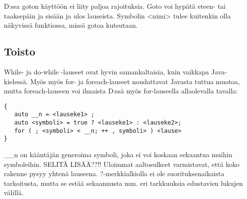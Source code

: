 \documentclass[11pt,oneside,a4paper]{article}
\begin{document}
D:ssa goton käyttöön ei liity paljoa rajoituksia. Goto voi hypätä eteen- tai taaksepäin ja sisään ja ulos lauseista. Symbolin <nimi> tulee kuitenkin olla näkyvissä funktiossa, missä gotoa kutsutaan. 


\subsection{Toisto}

While- ja do-while -lauseet ovat hyvin samankaltaisia, kuin vaikkapa
Java-kielessä. Myös myös for- ja foreach-lauseet noudattavat Javasta tuttua
muotoa, mutta foreach-lauseen voi ilmaista D:ssä myös for-lauseella allaolevalla
tavalla:

\begin{verbatim}
{
   auto __n = <lauseke1> ;
   auto <symboli> = true ? <lauseke1> : <lauseke2>;
   for ( ; <symboli> < __n; ++ , symboli> ) <lause>
}
\end{verbatim}

\_\_n on kääntäjän generoima symboli, joka ei voi koskaan sekaantua muihin
symboleihin. SELITÄ LISÄÄ??!! Uloimmat aaltosulkeet varmistavat, että koko
rakenne pysyy yhtenä lauseena. ?-merkkialkiolla ei ole suorituksenaikaista
tarkoitusta, mutta se estää sekaannusta mm. eri tarkkuuksia edustavien lukujen
välillä.
\end{document}
